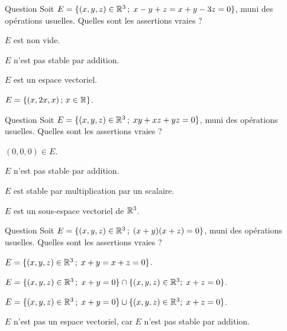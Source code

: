 \begin{multi}[multiple,feedback=
{\(E\) est un sous-espace vectoriel de \(\Rr^3\), puisque \((0,0,0)\in E\), \(E\) est stable par addition et multiplication par un scalaire.\\
En résolvant le système  : \(\left\{\begin{array}{rcc}
x-y+z&=&0\\
x+y-3z&=&0\end{array}\right.\), on obtient : \(E=\{(x,2x,x)  \, ; \,  x\in \Rr \}\).
}]{Question}
Soit \(E=\{(x,y,z) \in \mathbb{R}^3 \, ; \;  x-y+z = x+y-3z=0\}\), muni des opérations usuelles. Quelles sont les assertions vraies ?

    \item* \(E\) est non vide.
    \item \(E\) n'est pas stable par addition.
    \item* \(E\) est un espace vectoriel.
    \item* \(E=\{(x,2x,x)  \, ; \,  x\in \Rr \}\).
\end{multi}


\begin{multi}[multiple,feedback=
{\(E\) n'est pas un sous-espace vectoriel de \(\Rr^3\), puisque \(E\) n'est pas stable par addition : 
\((1,0,0), (0,1,0) \in E\), mais \((1,1,0) \notin E\). Cependant, \(E\) est stable par multipliction par un scalaire.
}]{Question}
Soit \(E=\{(x,y,z) \in \mathbb{R}^3 \, ; \;  xy+xz+yz = 0\}\), muni des opérations usuelles. Quelles sont les assertions vraies ?

    \item* \((0,0,0)\in E\).
    \item* \(E\) n'est pas stable par addition.
    \item* \(E\) est stable par multiplication par un scalaire.
    \item \(E\) est un sous-espace vectoriel de \(\Rr^3\).
\end{multi}


\begin{multi}[multiple,feedback=
{\(E= \{(x,y,z) \in \Rr^3 \,  ;\;  x+y=0 \; \mbox{ou} \;  x+z=0  \} =\{(x,y,z) \in \Rr^3 \,  ;\;  x+y=0\} \cup   
\{(x,y,z) \in \Rr^3 \,  ; \;  x+z=0\}\).
\(E\) n'est pas un espace vectoriel, car \(E\) n'est pas stable par addition : \((1,-1,0), (1,0,-1) \in E\), mais,  
\((2,-1,-1) \notin E\).
}]{Question}
Soit \(E=\{(x,y,z) \in \mathbb{R}^3 \,  ; \; (x+y)(x+z)=0\}\), muni des opérations usuelles. Quelles sont les assertions vraies ?

    \item \(E=\{(x,y,z) \in \mathbb{R}^3 \, ; \; x+y=x+z=0\}\).
    \item \(E=\{(x,y,z) \in \mathbb{R}^3 \, ; \;  x+y=0\} \cap   \{(x,y,z) \in \mathbb{R}^3 ; \; x+z=0\}\).
    \item* \(E=\{(x,y,z) \in \mathbb{R}^3 \, ; \;  x+y=0\} \cup   \{(x,y,z) \in \mathbb{R}^3 ; \; x+z=0\}\).
    \item* \(E\) n'est pas un espace vectoriel, car \(E\) n'est pas stable par addition.
\end{multi}


